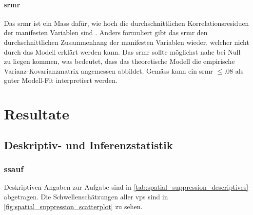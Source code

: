 \documentclass[11pt, twoside, a4paper]{book}		%
\begin{document}
\subsubsection*{\gls{srmr}}
Das \gls{srmr} ist ein Mass dafür, wie hoch die durchschnittlichen Korrelationsresiduen der manifesten Variablen sind \citep{Kline2011}. Anders formuliert gibt das \gls{srmr} den durchschnittlichen Zusammenhang der manifesten Variablen wieder, welcher nicht durch das Modell erklärt werden kann. Das \gls{srmr} sollte möglichst nahe bei Null zu liegen kommen, was bedeutet, dass das theoretische Modell die empirische Var\-ianz-Ko\-var\-ianz\-ma\-trix angemessen abbildet. Gemäss \citet{Hu1999} kann ein \gls{srmr} $\leq.08$ als guter Modell-Fit interpretiert werden.










\chapter{Resultate \label{cha:Resultate}}

\section{Deskriptiv- und Inferenzstatistik \label{sec:Deskriptive_Statistik}}

\subsection{\gls{ssauf} \label{subsec:SSres}}

Deskriptiven Angaben zur Aufgabe sind in \autoref{tab:spatial_suppression_descriptives} abgetragen. 
Die Schwellenschätzungen aller \glspl{vp} sind in \autoref{fig:spatial_suppression_scatterplot} zu sehen.
\end{document}
